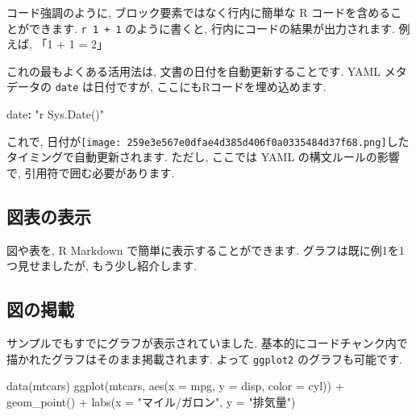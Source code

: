 \documentclass[
]{ltjsarticle}
\newenvironment{Shaded}{\begin{snugshade}}{\end{snugshade}}
\newcommand{\AttributeTok}[1]{\textcolor[rgb]{0.77,0.63,0.00}{#1}}
\newcommand{\FunctionTok}[1]{\textcolor[rgb]{0.00,0.00,0.00}{#1}}
\newcommand{\KeywordTok}[1]{\textcolor[rgb]{0.13,0.29,0.53}{\textbf{#1}}}
\newcommand{\NormalTok}[1]{#1}
\newcommand{\SpecialCharTok}[1]{\textcolor[rgb]{0.00,0.00,0.00}{#1}}
\newcommand{\StringTok}[1]{\textcolor[rgb]{0.31,0.60,0.02}{#1}}
\begin{document}
コード強調のように, ブロック要素ではなく行内に簡単な R コードを含めることができます. \texttt{\textasciigrave{}r\ 1\ +\ 1\textasciigrave{}} のように書くと, 行内にコードの結果が出力されます. 例えば, 「1 + 1 = 2」

これの最もよくある活用法は, 文書の日付を自動更新することです. YAML メタデータの \texttt{date} は日付ですが, ここにもRコードを埋め込めます.

\begin{Shaded}
\begin{Highlighting}[]
\FunctionTok{date}\KeywordTok{:}\AttributeTok{ }\StringTok{"\textasciigrave{}r Sys.Date()\textasciigrave{}"}
\end{Highlighting}
\end{Shaded}

これで, 日付が\texttt{[image: 259e3e567e0dfae4d385d406f0a0335484d37f68.png]}したタイミングで自動更新されます. ただし, ここでは YAML の構文ルールの影響で, 引用符で囲む必要があります.

\hypertarget{figure-tables}{%
\subsection{図表の表示}\label{figure-tables}}

図や表を, R Markdown で簡単に表示することができます. グラフは既に例1を1つ見せましたが, もう少し紹介します.

\hypertarget{ux56f3ux306eux63b2ux8f09}{%
\subsection{図の掲載}\label{ux56f3ux306eux63b2ux8f09}}

サンプルでもすでにグラフが表示されていました. 基本的にコードチャンク内で描かれたグラフはそのまま掲載されます. よって \texttt{ggplot2} のグラフも可能です.

\begin{Shaded}
\begin{Highlighting}[numbers=left,,]
\FunctionTok{data}\NormalTok{(mtcars)}
\FunctionTok{ggplot}\NormalTok{(mtcars, }\FunctionTok{aes}\NormalTok{(}\AttributeTok{x =}\NormalTok{ mpg, }\AttributeTok{y =}\NormalTok{ disp, }\AttributeTok{color =}\NormalTok{ cyl)) }\SpecialCharTok{+}
  \FunctionTok{geom\_point}\NormalTok{() }\SpecialCharTok{+}
  \FunctionTok{labs}\NormalTok{(}\AttributeTok{x =} \StringTok{"マイル/ガロン"}\NormalTok{, }\AttributeTok{y =} \StringTok{"排気量"}\NormalTok{)}
\end{Highlighting}
\end{Shaded}
\end{document}
